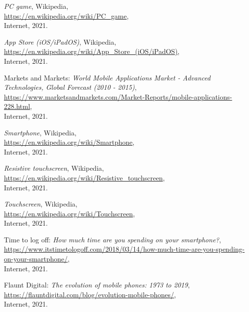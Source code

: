 \begin{thebibliography}{x}
	\emph{PC game}, Wikipedia, \\
	\url{https://en.wikipedia.org/wiki/PC_game}, \\
	Internet, 2021.
	
	\emph{App Store (iOS/iPadOS)}, Wikipedia, \\
	\url{https://en.wikipedia.org/wiki/App_Store_(iOS/iPadOS)}, \\
	Internet, 2021.
	
	Markets and Markets: \emph{World Mobile Applications Market - Advanced Technologies, Global Forecast (2010 - 2015)}, \\
	\url{https://www.marketsandmarkets.com/Market-Reports/mobile-applications-228.html}, \\
	Internet, 2021.
	
	\emph{Smartphone}, Wikipedia, \\
	\url{https://en.wikipedia.org/wiki/Smartphone}, \\
	Internet, 2021.
	
	\emph{Resistive touchscreen}, Wikipedia, \\
	\url{https://en.wikipedia.org/wiki/Resistive_touchscreen}, \\
	Internet, 2021.
	
	\emph{Touchscreen}, Wikipedia, \\
	\url{https://en.wikipedia.org/wiki/Touchscreen}, \\
	Internet, 2021.
	
	Time to log off: \emph{How much time are you spending on your smartphone?}, \\
	\url{https://www.itstimetologoff.com/2018/03/14/how-much-time-are-you-spending-on-your-smartphone/}, \\
	Internet, 2021.
	
	Flaunt Digital: \emph{The evolution of mobile phones: 1973 to 2019}, \\
	\url{https://flauntdigital.com/blog/evolution-mobile-phones/}, \\
	Internet, 2021.
	

\end{thebibliography}
